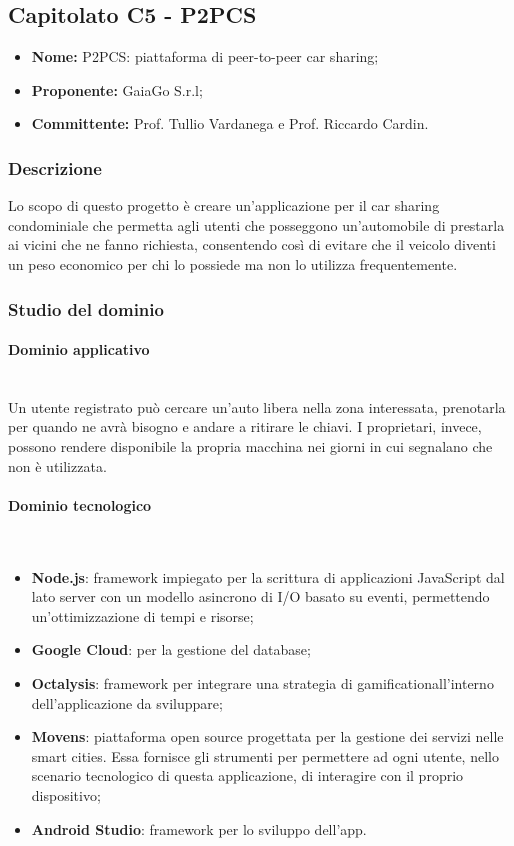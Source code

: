 \subsection{Capitolato C5 - P2PCS}
\begin{itemize}
\item \textbf{Nome:} P2PCS: piattaforma di peer-to-peer car sharing;
\item \textbf{Proponente:} GaiaGo S.r.l;
\item \textbf{Committente:} Prof. Tullio Vardanega e Prof. Riccardo Cardin.
\end{itemize}
\subsubsection{Descrizione}
Lo scopo di questo progetto è creare un'applicazione per il car sharing 
condominiale che permetta agli utenti che posseggono un'automobile di prestarla 
ai vicini che ne fanno richiesta, consentendo così di evitare che il veicolo 
diventi un peso economico per chi lo possiede ma non lo utilizza frequentemente.

\subsubsection{Studio del dominio}
\paragraph{Dominio applicativo} \mbox{}\\
Un utente registrato può cercare un'auto libera nella zona interessata, 
prenotarla per quando ne avrà bisogno e andare a ritirare le chiavi. I 
proprietari, invece, possono rendere disponibile la propria macchina nei giorni in cui segnalano che non è utilizzata.

\paragraph{Dominio tecnologico} \mbox{}\\
\begin{itemize}
	\item \textbf{Node.js}: framework impiegato per la scrittura di applicazioni 
JavaScript dal lato server con un modello asincrono di I/O basato su eventi, 
permettendo un'ottimizzazione di tempi e risorse;
	\item \textbf{Google Cloud}: per la gestione del database;
	\item \textbf{Octalysis}: framework per integrare una strategia di gamification\glosp all'interno dell'applicazione da sviluppare;
	\item \textbf{Movens}: piattaforma open source progettata per la gestione dei servizi nelle smart cities. Essa fornisce gli strumenti per permettere ad ogni	utente, nello scenario tecnologico di questa applicazione, di interagire con il proprio dispositivo;
	\item \textbf{Android Studio}: framework per lo sviluppo dell'app.
\end{itemize}

